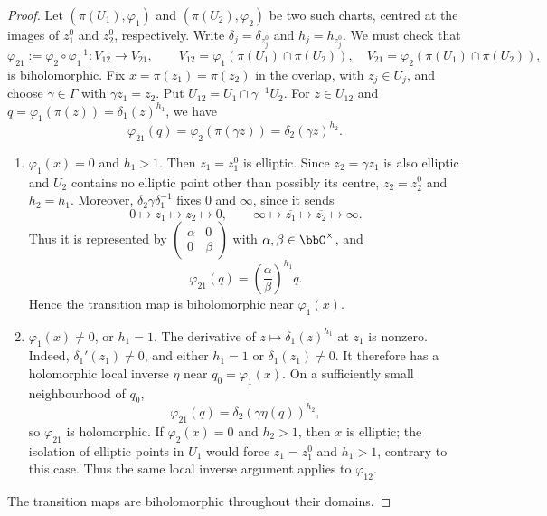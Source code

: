 \begin{proof}
    Let $(\pi(U_1), \varphi_1)$ and $(\pi(U_2), \varphi_2)$ be two such charts, centred at the images of $z_1^0$ and $z_2^0$, respectively. Write $\delta_j = \delta_{z_j^0}$ and $h_j = h_{z_j^0}$. We must check that
    \[
        \varphi_{21} := \varphi_2 \circ \varphi_1^{-1} : V_{12} \longrightarrow V_{21}, \qquad V_{12} = \varphi_1(\pi(U_1) \cap \pi(U_2)), \quad V_{21} = \varphi_2(\pi(U_1) \cap \pi(U_2)),
    \]
    is biholomorphic. Fix $x = \pi(z_1) = \pi(z_2)$ in the overlap, with $z_j \in U_j$, and choose $\gamma \in \Gamma$ with $\gamma z_1 = z_2$. Put $U_{12} = U_1 \cap \gamma^{-1}U_2$. For $z \in U_{12}$ and $q = \varphi_1(\pi(z)) = \delta_1(z)^{h_1}$, we have
    \[
        \varphi_{21}(q) = \varphi_2(\pi(\gamma z)) = \delta_2(\gamma z)^{h_2}.
    \]
    \begin{enumerate}[label=\textit{Case~\arabic*.}]
        \item $\varphi_1(x) = 0$ and $h_1 > 1$.
        Then $z_1 = z_1^0$ is elliptic. Since $z_2 = \gamma z_1$ is also elliptic and $U_2$ contains no elliptic point other than possibly its centre, $z_2 = z_2^0$ and $h_2 = h_1$. Moreover, $\delta_2\gamma\delta_1^{-1}$ fixes $0$ and $\infty$, since it sends
        \[
            0 \longmapsto z_1 \longmapsto z_2 \longmapsto 0, \qquad \infty \longmapsto \overline{z_1} \longmapsto \overline{z_2} \longmapsto \infty.
        \]
        Thus it is represented by $\begin{pmatrix}\alpha & 0\\ 0 & \beta\end{pmatrix}$ with $\alpha, \beta \in \bbC^\times$, and
        \[
            \varphi_{21}(q) = \left(\frac{\alpha}{\beta}\right)^{h_1}q.
        \]
        Hence the transition map is biholomorphic near $\varphi_1(x)$.
        \item $\varphi_1(x) \neq 0$, or $h_1 = 1$.
        The derivative of $z \mapsto \delta_1(z)^{h_1}$ at $z_1$ is nonzero. Indeed, $\delta_1'(z_1) \neq 0$, and either $h_1 = 1$ or $\delta_1(z_1) \neq 0$. It therefore has a holomorphic local inverse $\eta$ near $q_0 = \varphi_1(x)$. On a sufficiently small neighbourhood of $q_0$,
        \[
            \varphi_{21}(q) = \delta_2(\gamma\eta(q))^{h_2},
        \]
        so $\varphi_{21}$ is holomorphic. If $\varphi_2(x) = 0$ and $h_2 > 1$, then $x$ is elliptic; the isolation of elliptic points in $U_1$ would force $z_1 = z_1^0$ and $h_1 > 1$, contrary to this case. Thus the same local inverse argument applies to $\varphi_{12}$.
    \end{enumerate}
    The transition maps are biholomorphic throughout their domains.
\end{proof}

